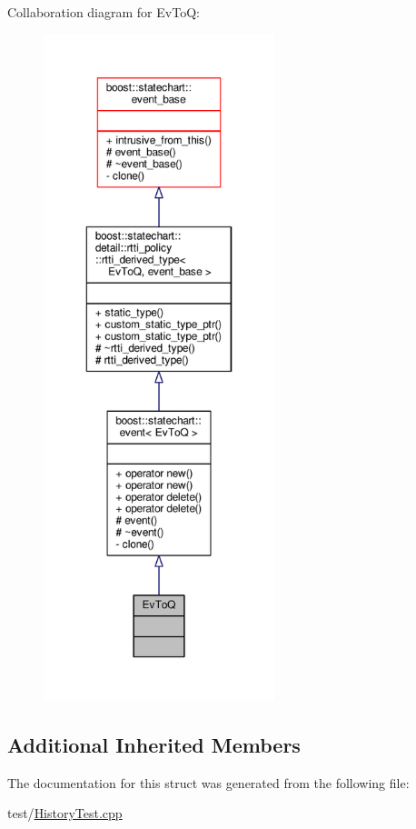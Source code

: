 Collaboration diagram for Ev\+ToQ\+:
\nopagebreak
\begin{figure}[H]
\begin{center}
\leavevmode
\includegraphics[height=550pt]{struct_ev_to_q__coll__graph}
\end{center}
\end{figure}
\subsection*{Additional Inherited Members}


The documentation for this struct was generated from the following file\+:\begin{DoxyCompactItemize}
\item 
test/\mbox{\hyperlink{_history_test_8cpp}{History\+Test.\+cpp}}\end{DoxyCompactItemize}
